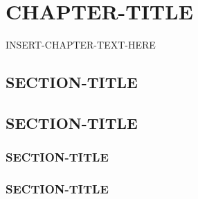 \chapter{CHAPTER-TITLE}
\thispagestyle{plain}

\label{CHAPTER-LABEL}

INSERT-CHAPTER-TEXT-HERE

\section{SECTION-TITLE}
\label{SECTION-LABEL}

\section{SECTION-TITLE}
\label{SECTION-LABEL}

\cite{Smith2006}

\subsection{SECTION-TITLE}
\label{SECTION-LABEL}

\subsection{SECTION-TITLE}
\label{SECTION-LABEL}


